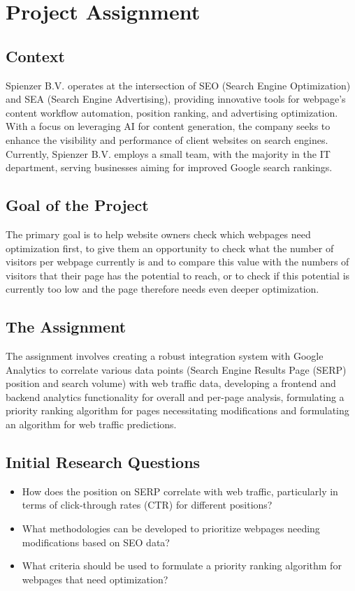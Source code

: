 \documentclass[12pt,a4paper]{article}
\begin{document}
\newpage
\setcounter{page}{1}
\section{Project Assignment}
\subsection{Context}
Spienzer B.V. operates at the intersection of SEO (Search Engine Optimization) and SEA (Search Engine Advertising), providing innovative tools for webpage’s content workflow automation, position ranking, and advertising optimization. With a focus on leveraging AI for content generation, the company seeks to enhance the visibility and performance of client websites on search engines. Currently, Spienzer B.V. employs a small team, with the majority in the IT department, serving businesses aiming for improved Google search rankings.
\subsection{Goal of the Project}
The primary goal is to help website owners check which webpages need optimization first, to give them an opportunity to check what the number of visitors per webpage currently is and to compare this value with the numbers of visitors that their page has the potential to reach, or to check if this potential is currently too low and the page therefore needs even deeper optimization.
\subsection{The Assignment}
The assignment involves creating a robust integration system with Google Analytics to correlate various data points (Search Engine Results Page (SERP) position and search volume) with web traffic data, developing a frontend and backend analytics functionality for overall and per-page analysis, formulating a priority ranking algorithm for pages necessitating modifications and formulating an algorithm for web traffic predictions.
\subsection{Initial Research Questions}
\begin{itemize}
    \item How does the position on SERP correlate with web traffic, particularly in terms of click-through rates (CTR) for different positions?
    \item What methodologies can be developed to prioritize webpages needing modifications based on SEO data?
    \item What criteria should be used to formulate a priority ranking algorithm for webpages that need optimization?
\end{itemize}
\end{document}
